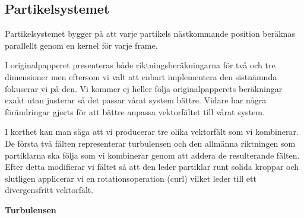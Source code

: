 \documentclass[a4paper]{article}
\begin{document}
\begin{multicols}{2}
    \vspace{-0.35cm}
    \subsection{Partikelsystemet} \label{sec:partikelsystemet}

    Partikelsystemet bygger på att varje partikels nästkommande position beräknas parallellt genom en  kernel för varje frame. 

    I originalpapperet presenteras både riktningsberäkningarna för två och tre dimensioner men eftersom vi valt att enbart implementera den sistnämnda fokuserar vi på den. Vi kommer ej heller följa originalpapperets beräkningar exakt utan justerar så det passar vårat system bättre. Vidare har några förändringar gjorts för att bättre anpassa vektorfältet till vårat system.

    I korthet kan man säga att vi producerar tre olika vektorfält som vi kombinerar. De första två fälten representerar turbulensen och den allmänna riktningen som partiklarna ska följa som vi kombinerar genom att addera de resulterande fälten. Efter detta modifierar vi fältet så att den leder partiklar runt solida kroppar och slutligen applicerar vi en rotationsoperation (curl) vilket leder till ett divergensfritt vektorfält.

    \textbf{Turbulensen}


\end{multicols}
\end{document}

